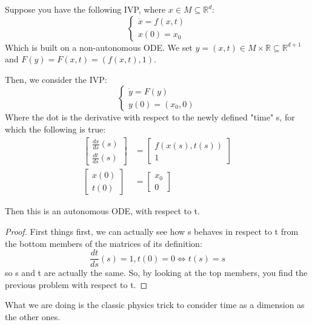 \begin{proposition}
    Suppose you have the following IVP, where $x\in M\subseteq\mathbb{R}^d$:
\begin{equation*}
    \begin{cases}
        \dot{x}=f(x, t) \\
        x(0)=x_0
    \end{cases}
\end{equation*}
Which is built on a non-autonomous ODE. We set $y=(x, t) \in M\times\mathbb{R}\subseteq\mathbb{R}^{d+1}$ and $F(y)=F(x, t)= (f(x, t), 1)$.

Then, we consider the IVP:
\begin{equation*}
    \begin{cases}
       \dot{y}=F(y)\\
       y(0)=(x_0, 0) 
    \end{cases}
    \label{eq:y_ode}
\end{equation*}
Where the dot is the derivative with respect to the newly defined "time" s,  for which the following is true:
\begin{align*}
    \begin{bmatrix}
        \frac{dx}{ds}(s) \\ \frac{dt}{ds}(s)
    \end{bmatrix}&=\begin{bmatrix}
        f(x(s), t(s)) \\ 1
    \end{bmatrix} \\
   \begin{bmatrix}
    x(0) \\ t(0)
   \end{bmatrix}&=\begin{bmatrix}
    x_0 \\ 0
   \end{bmatrix}
\end{align*}

Then this is an autonomous ODE, with respect to t. 
\end{proposition}
\begin{proof}
First things first, we can actually see how s behaves in respect to t from the bottom members of the matrices of its definition:
    \begin{equation*}
    \frac{dt}{ds}(s)=1, t(0)=0 \Leftrightarrow t(s)=s
    \end{equation*}
so s and t are actually the same. So, by looking at the top members, you find the previous problem with respect to t.
\end{proof}
\begin{observation}
    What we are doing is the classic physics trick to consider time as a dimension as the other ones.
\end{observation}

